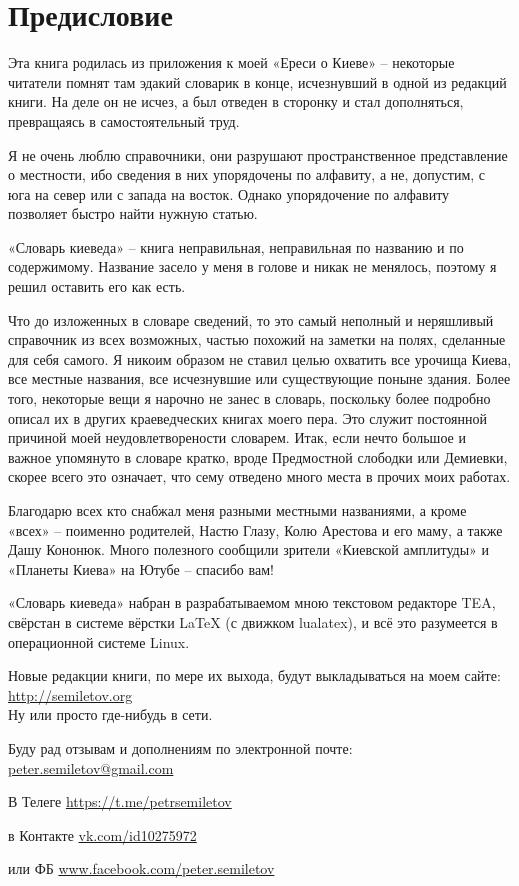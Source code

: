 \chapter*{Предисловие}

Эта книга родилась из приложения к моей «Ереси о Киеве» – некоторые читатели помнят там эдакий словарик в конце, исчезнувший в одной из редакций книги. На деле он не исчез, а был отведен в сторонку и стал дополняться, превращаясь в самостоятельный труд.

Я не очень люблю справочники, они разрушают пространственное представление о местности, ибо сведения в них упорядочены по алфавиту, а не, допустим, с юга на север или с запада на восток. Однако упорядочение по алфавиту позволяет быстро найти нужную статью.

«Словарь киеведа» – книга неправильная, неправильная по названию и по содержимому. Название засело у меня в голове и никак не менялось, поэтому я решил оставить его как есть. 

Что до изложенных в словаре сведений, то это самый неполный и неряшливый справочник из всех возможных, частью похожий на заметки на полях, сделанные для себя самого. Я никоим образом не ставил целью охватить все урочища Киева, все местные названия, все исчезнувшие или существующие поныне здания. Более того, некоторые вещи я нарочно не занес в словарь, поскольку более подробно описал их в других краеведческих книгах моего пера. Это служит постоянной причиной моей неудовлетворености словарем. Итак, если нечто большое и важное упомянуто в словаре кратко, вроде Предмостной слободки или Демиевки, скорее всего это означает, что сему отведено много места в прочих моих работах.

Благодарю всех кто снабжал меня разными местными названиями, а кроме «всех» – поименно родителей, Настю Глазу, Колю Арестова и его маму, а также Дашу Кононюк. Много полезного сообщили зрители «Киевской амплитуды» и «Планеты Киева» на Ютубе – спасибо вам!

«Словарь киеведа» набран в разрабатываемом мною текстовом редакторе TEA, свёрстан в системе вёрстки LaTeX (с движком lualatex), и всё это разумеется в операционной системе Linux.

Новые редакции книги, по мере их выхода, будут выкладываться на моем сайте:\\ 
\href{http://semiletov.org}{http://semiletov.org}\\
Ну или просто где-нибудь в сети.

Буду рад отзывам и дополнениям по электронной почте: \href{mailto:peter.semiletov@gmail.com}{peter.semiletov@gmail.com}

В Телеге \href{https://t.me/petrsemiletov}{https://t.me/petrsemiletov}

в Контакте \href{https://vk.com/id10275972}{vk.com/id10275972} 

или ФБ \href{https://www.facebook.com/peter.semiletov}{www.facebook.com/peter.semiletov}
